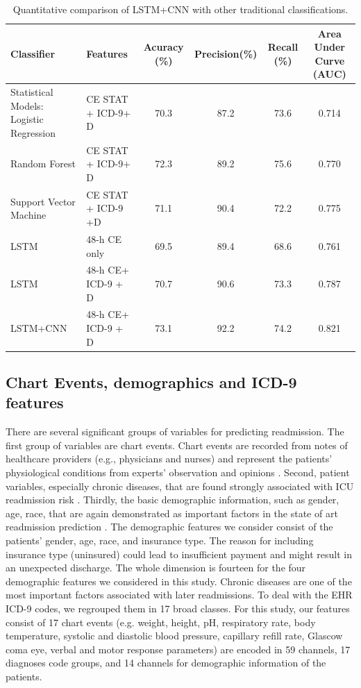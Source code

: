 \documentclass[letterpaper, 10pt, conference]{ieeeconf} %
\newcommand{\otoprule}{\midrule[\heavyrulewidth]}
\begin{document}
 \begin{table}[h!]
\centering
\caption{Quantitative comparison of  LSTM+CNN with other traditional classifications.}   \label{table:performance_comparison}
 \begin{tabularx}{0.96\textwidth}{X Xcccc}
    \toprule
    Classifier & Features&  Acuracy (\%)& Precision(\%)& Recall (\%)& Area Under Curve (AUC) \\
    \otoprule
     Statistical Models:
     Logistic Regression & CE STAT + ICD-9+ D &  70.3 & 87.2& 73.6& 0.714 \\
     Random Forest & CE STAT + ICD-9+ D &  72.3 & 89.2& 75.6 & 0.770 \\
     Support Vector Machine & CE STAT + ICD-9 +D &  71.1 & 90.4& 72.2 & 0.775 \\
     \midrule
     LSTM & 48-h CE only &  69.5 & 89.4& 68.6& 0.761\\
     LSTM & 48-h CE+ ICD-9 + D &  70.7 & 90.6& 73.3 & 0.787\\
     LSTM+CNN & 48-h CE+ ICD-9 + D &  73.1 & 92.2& 74.2 & 0.821\\
     
    \bottomrule
  \end{tabularx}
\end{table}
 
 \subsection{Chart Events, demographics and ICD-9 features}
   
There are several significant groups of variables for predicting readmission. The first 
group of variables are chart events. Chart events are recorded from notes of healthcare providers (e.g., physicians and nurses) and represent the patients’ physiological conditions from experts’ observation and opinions \cite{XUE2018}.  Second, patient variables, especially chronic diseases, that are found strongly associated with ICU readmission risk \cite{Brown2013}. Thirdly, the basic demographic information, such as gender, age, race, that are again demonstrated as important factors in the state of art readmission prediction . The demographic features we consider consist of the patients’ gender, age, race, and insurance type. The reason for including insurance type (uninsured) could lead to insufficient payment and might result in an unexpected discharge. The whole dimension is fourteen for the four demographic features we considered in this study.
Chronic diseases are one of the most important factors associated with later readmissions. To deal with the EHR ICD-9 codes, we regrouped them in 17 broad classes. For this study, our features consist of 17
chart events (e.g. weight, height, pH, respiratory rate, body temperature, systolic and diastolic blood pressure, capillary refill rate, Glascow coma eye, verbal and motor response parameters) are encoded in 59 channels, 17 diagnoses code groups, and 14 channels for demographic information of the patients. 
\end{document}

